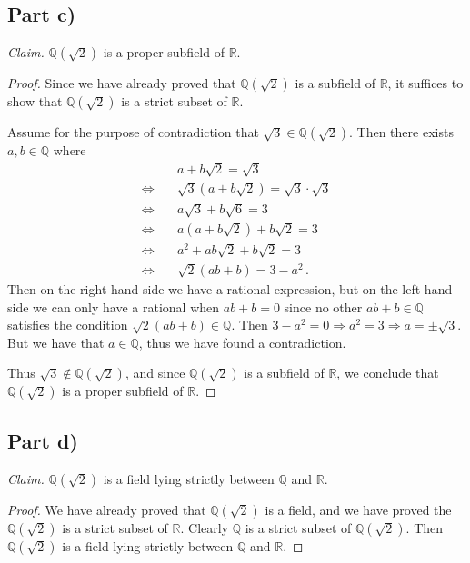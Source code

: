 \documentclass{abrice}
\newcommand{\R}{\mathbb{R}}
\newcommand{\Q}{\mathbb{Q}}
\begin{document}
\subsection{Part c)}

\emph{Claim.} $\Q(\sqrt 2)$ is a proper subfield of $\R$.

\begin{proof}
  Since we have already proved that $\Q(\sqrt 2)$ is a subfield of $\R$, it
  suffices to show that $\Q(\sqrt 2)$ is a strict subset of $\R$.

  Assume for the purpose of contradiction that $\sqrt{3} \in \Q(\sqrt 2)$. Then
  there exists $a,b \in \Q$ where
  \begin{align*}
    &a + b \sqrt 2 = \sqrt 3 \\ \Longleftrightarrow \quad
    &\sqrt 3(a + b \sqrt 2) = \sqrt 3 \cdot \sqrt 3 \\ \Longleftrightarrow \quad
    &a \sqrt 3 + b \sqrt 6 = 3 \\ \Longleftrightarrow \quad
    &a (a + b \sqrt 2) + b \sqrt 2 = 3 \\ \Longleftrightarrow \quad
    &a^2 + ab\sqrt 2 + b \sqrt 2 = 3 \\ \Longleftrightarrow \quad
    & \sqrt 2 (ab + b) = 3 - a^2\, .
  \end{align*}
  Then on the right-hand side we have a rational expression, but on the
  left-hand side we can only have a rational when $ab + b = 0$ since no other
  $ab + b \in \Q$ satisfies the condition $\sqrt 2 (ab + b) \in \Q$. Then $3 -
  a^2 = 0 \Rightarrow a^2 = 3 \Rightarrow a = \pm \sqrt 3$. But we have that $a
  \in \Q$, thus we have found a contradiction.

  Thus $\sqrt 3 \notin \Q(\sqrt 2)$, and since $\Q(\sqrt 2)$ is a subfield of
  $\R$, we conclude that $\Q(\sqrt 2)$ is a proper subfield of $\R$.
\end{proof}

\subsection{Part d)}

\emph{Claim.} $\Q(\sqrt 2)$ is a field lying strictly between $\Q$ and $\R$.

\begin{proof}
  We have already proved that $\Q(\sqrt 2)$ is a field, and we have proved the
  $\Q(\sqrt 2)$ is a strict subset of $\R$. Clearly $\Q$ is a strict subset of
  $\Q(\sqrt 2)$. Then $\Q(\sqrt 2)$ is a field lying strictly between $\Q$ and
  $\R$.
\end{proof}
\end{document}
